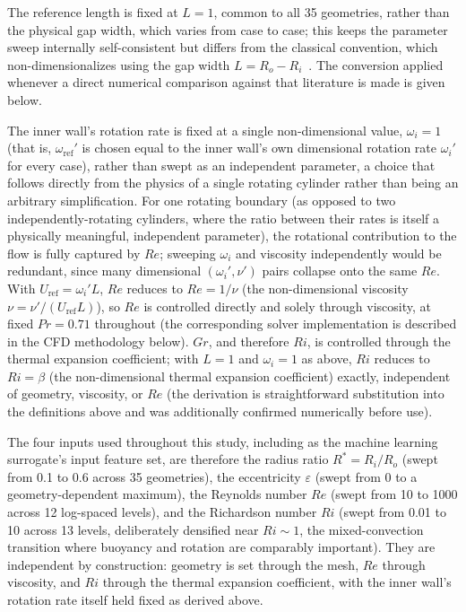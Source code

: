 The reference length is fixed at $L=1$, common to all 35 geometries, rather than the physical gap width, which varies from case to case; this keeps the parameter sweep internally self-consistent but differs from the classical convention, which non-dimensionalizes using the gap width $L = R_o - R_i$~\cite{KuehnGoldstein1978,Lee1992a,Lee1992b,Yoo1998}. The conversion applied whenever a direct numerical comparison against that literature is made is given below.

The inner wall's rotation rate is fixed at a single non-dimensional value, $\omega_i=1$ (that is, $\omega_{\text{ref}}'$ is chosen equal to the inner wall's own dimensional rotation rate $\omega_i'$ for every case), rather than swept as an independent parameter, a choice that follows directly from the physics of a single rotating cylinder rather than being an arbitrary simplification. For one rotating boundary (as opposed to two independently-rotating cylinders, where the ratio between their rates is itself a physically meaningful, independent parameter), the rotational contribution to the flow is fully captured by $Re$; sweeping $\omega_i$ and viscosity independently would be redundant, since many dimensional $(\omega_i',\nu')$ pairs collapse onto the same $Re$. With $U_{\text{ref}}=\omega_i'L$, $Re$ reduces to $Re=1/\nu$ (the non-dimensional viscosity $\nu=\nu'/(U_{\text{ref}}L)$), so $Re$ is controlled directly and solely through viscosity, at fixed $Pr=0.71$ throughout (the corresponding solver implementation is described in the CFD methodology below). $Gr$, and therefore $Ri$, is controlled through the thermal expansion coefficient; with $L=1$ and $\omega_i=1$ as above, $Ri$ reduces to $Ri=\beta$ (the non-dimensional thermal expansion coefficient) exactly, independent of geometry, viscosity, or $Re$ (the derivation is straightforward substitution into the definitions above and was additionally confirmed numerically before use).

The four inputs used throughout this study, including as the machine learning surrogate's input feature set, are therefore the radius ratio $R^\ast = R_i/R_o$ (swept from 0.1 to 0.6 across 35 geometries), the eccentricity $\varepsilon$ (swept from 0 to a geometry-dependent maximum), the Reynolds number $Re$ (swept from 10 to 1000 across 12 log-spaced levels), and the Richardson number $Ri$ (swept from 0.01 to 10 across 13 levels, deliberately densified near $Ri\sim1$, the mixed-convection transition where buoyancy and rotation are comparably important). They are independent by construction: geometry is set through the mesh, $Re$ through viscosity, and $Ri$ through the thermal expansion coefficient, with the inner wall's rotation rate itself held fixed as derived above.

